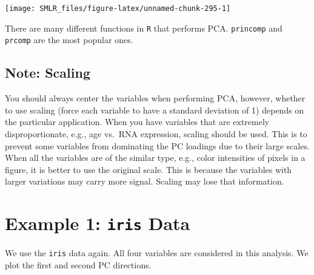 \documentclass[
]{book}
\newenvironment{Shaded}{\begin{snugshade}}{\end{snugshade}}
\newcommand{\AttributeTok}[1]{\textcolor[rgb]{0.13,0.29,0.53}{#1}}
\newcommand{\DecValTok}[1]{\textcolor[rgb]{0.00,0.00,0.81}{#1}}
\newcommand{\FunctionTok}[1]{\textcolor[rgb]{0.13,0.29,0.53}{\textbf{#1}}}
\newcommand{\NormalTok}[1]{#1}
\newcommand{\OtherTok}[1]{\textcolor[rgb]{0.56,0.35,0.01}{#1}}
\newcommand{\SpecialCharTok}[1]{\textcolor[rgb]{0.81,0.36,0.00}{\textbf{#1}}}
\newcommand{\StringTok}[1]{\textcolor[rgb]{0.31,0.60,0.02}{#1}}
\theoremstyle{definition}
\theoremstyle{definition}
\theoremstyle{definition}
\theoremstyle{definition}
\theoremstyle{remark}
\begin{document}
\begin{center}\texttt{[image: SMLR\_files/figure-latex/unnamed-chunk-295-1]} \end{center}

There are many different functions in \texttt{R} that performs PCA. \texttt{princomp} and \texttt{prcomp} are the most popular ones.

\hypertarget{note-scaling}{%
\subsection{Note: Scaling}\label{note-scaling}}

You should always center the variables when performing PCA, however, whether to use scaling (force each variable to have a standard deviation of 1) depends on the particular application. When you have variables that are extremely disproportionate, e.g., age vs.~RNA expression, scaling should be used. This is to prevent some variables from dominating the PC loadings due to their large scales. When all the variables are of the similar type, e.g., color intensities of pixels in a figure, it is better to use the original scale. This is because the variables with larger variations may carry more signal. Scaling may lose that information.

\hypertarget{example-1-iris-data-2}{%
\section{\texorpdfstring{Example 1: \texttt{iris} Data}{Example 1: iris Data}}\label{example-1-iris-data-2}}

We use the \texttt{iris} data again. All four variables are considered in this analysis. We plot the first and second PC directions.

\begin{Shaded}
\end{Shaded}
\end{document}

